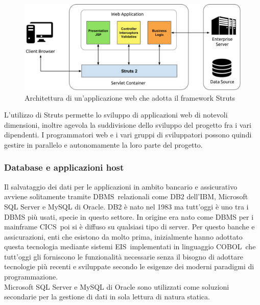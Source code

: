 	\begin{figure}[H]
		\centering
	   	\includegraphics[width=1\textwidth]{immagini/architettura_struts}
	   	\caption{Architettura di un'applicazione web che adotta il framework Struts}
	\end{figure}	
	
	L'utilizzo di Struts permette lo sviluppo di applicazioni web di notevoli dimensioni, inoltre agevola la suddivisione dello sviluppo del progetto fra i vari dipendenti. I programmatori web e i vari gruppi di sviluppatori possono quindi gestire in parallelo e autonomamente la loro parte del progetto.
	
	\subsubsection{Database e applicazioni host}
	Il salvataggio dei dati per le applicazioni in ambito bancario e assicurativo avviene solitamente tramite DBMS\glossario\ relazionali come DB2 dell'IBM, Microsoft SQL Server e MySQL di Oracle. DB2 è nato nel 1983 ma tutt'oggi è uno tra i DBMS più usati, specie in questo settore. In origine era nato come DBMS per i mainframe CICS\glossario\, poi si è diffuso su qualsiasi tipo di server. Per questo banche e assicurazioni, enti che esistono da molto prima, inizialmente hanno adottato questa tecnologia mediante sistemi EIS\glossario\ implementati in linguaggio COBOL\glossario\ che tutt'oggi gli forniscono le funzionalità necessarie senza il bisogno di adottare tecnologie più recenti e sviluppate secondo le esigenze dei moderni paradigmi di programmazione.\\
	
	
	Microsoft SQL Server e MySQL di Oracle sono utilizzati come soluzioni secondarie per la gestione di dati in sola lettura di natura statica.
		
